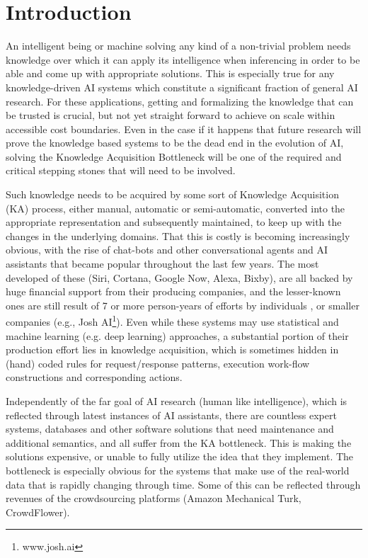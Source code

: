 % 
\chapter{Introduction}
An intelligent being or machine solving any kind of a non-trivial problem needs
knowledge over which it can apply its intelligence when inferencing in order to
be able and come up with appropriate solutions. This is especially true for any 
knowledge-driven AI systems which constitute a significant fraction of general 
AI research. For these applications, getting and formalizing the knowledge that
can be trusted is crucial, but not yet straight forward to achieve on scale 
within accessible cost boundaries. Even in the case if it happens that future 
research will prove the knowledge based systems to be the dead end in the
evolution of AI, solving the Knowledge Acquisition 
Bottleneck\parencite{Wagner2006} will be one of the required and critical 
stepping stones that will need to be involved.

Such knowledge needs to be acquired by some sort of Knowledge Acquisition (KA) 
process, either manual, automatic or semi-automatic, converted into the
appropriate representation and subsequently maintained, to keep up with the
changes in the underlying domains. That this is costly is becoming 
increasingly obvious, with the rise of chat-bots and other conversational 
agents and AI assistants that became popular throughout the last few years. 
The most developed of these (Siri, Cortana, Google Now, Alexa, Bixby), are 
all backed by huge financial support from their producing companies, and the 
lesser-known ones are still result of 7 or more person-years of efforts by
individuals \parencite{Wilcox2011, Wallace2013}, or smaller companies (e.g.,
Josh AI\footnote{www.josh.ai}). Even while these systems may use statistical
and machine learning (e.g. deep learning) approaches, a substantial 
portion of their production effort lies in knowledge acquisition, which is 
sometimes hidden in (hand) coded rules for request/response patterns, execution
work-flow constructions and corresponding actions.

Independently of the far goal of AI research (human like intelligence), which
is reflected through latest instances of AI assistants, there are countless 
expert systems, databases and other software solutions that need maintenance
and additional semantics, and all suffer from the KA bottleneck. This is making
the solutions expensive, or unable to fully utilize the idea that they 
implement. The bottleneck is especially obvious for the systems that make use 
of the real-world data that is rapidly changing through time. Some of this can
be reflected through revenues of the crowdsourcing platforms (Amazon Mechanical
Turk, CrowdFlower).

